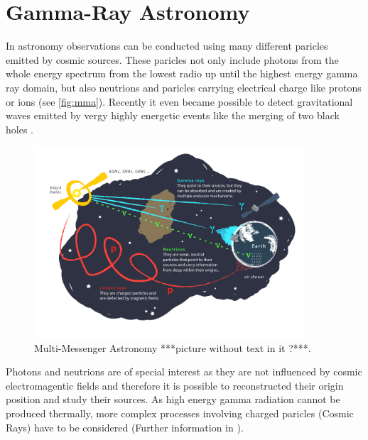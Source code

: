 \chapter{Gamma-Ray Astronomy}
In astronomy observations can be conducted using many different paricles emitted by cosmic sources. 
These paricles not only include photons from the whole energy spectrum from the lowest radio up until the highest energy gamma ray domain,
but also neutrions and paricles carrying electrical charge like protons or ions (see \autoref{fig:mma}). 
Recently it even became possible to detect gravitational waves emitted by vergy highly energetic events like the merging of two black holes \cite{PhysRevLett.116.061102}.
\begin{figure}
    \centering
    \includegraphics[width=0.9\textwidth]{logos/cosmic_messengers.png}
    \caption{Multi-Messenger Astronomy ***picture without text in it ?***.}
    \label{fig:mma}
\end{figure}

Photons and neutrions are of special interest as they are not influenced by cosmic electromagentic fields and therefore it is possible to reconstructed their origin 
position and study their sources.
As high energy gamma radiation cannot be produced thermally, more complex processes involving charged paricles (Cosmic Rays) have to be considered 
(Further information in \cite{s_funk}).

